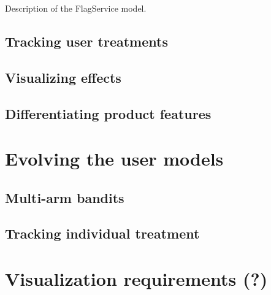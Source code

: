 Description of the FlagService model.


\subsection{Tracking user treatments} %
\label{sub:tracking_user_treatments}


\subsection{Visualizing effects} %
\label{sub:visualizing_effects}



\subsection{Differentiating product features} %
\label{sec:differentiating_product_features}


\section{Evolving the user models} %
\label{sec:evolving_the_user_models}

\subsection{Multi-arm bandits}

\subsection{Tracking individual treatment}


\section{Visualization requirements (?)} %
\label{sec:visualization_requirements}

